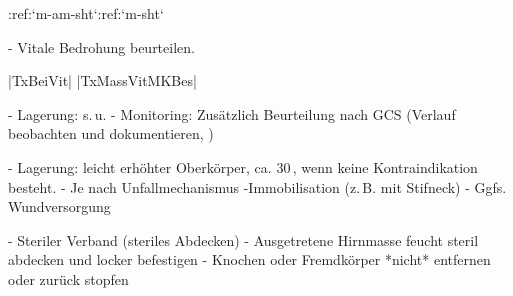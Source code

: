 :ref:`m-am-sht`:ref:`m-sht`
\begin{itemize}
  -   Vitale Bedrohung beurteilen. \par |TxBeiVit|
  |TxMassVitMKBes|
  \begin{itemize}
    -   Lagerung: s.\,u.
    -   Monitoring: Zusätzlich Beurteilung nach GCS (Verlauf beobachten und
    dokumentieren, )
  \end{itemize}
  -   Lagerung: leicht erhöhter Oberkörper, ca.
  30\,\textdegree{}, wenn keine Kontraindikation
  besteht.
  -   Je nach Unfallmechanismus -Immobilisation (z.\,B. mit Stifneck\texttrademark)
  -   Ggfs. Wundversorgung
  \begin{itemize}
    -   Steriler Verband (steriles Abdecken)
    -   Ausgetretene Hirnmasse feucht steril abdecken
        und locker befestigen
    -   Knochen oder Fremdkörper *nicht* entfernen oder zurück stopfen
  \end{itemize}
\end{itemize}